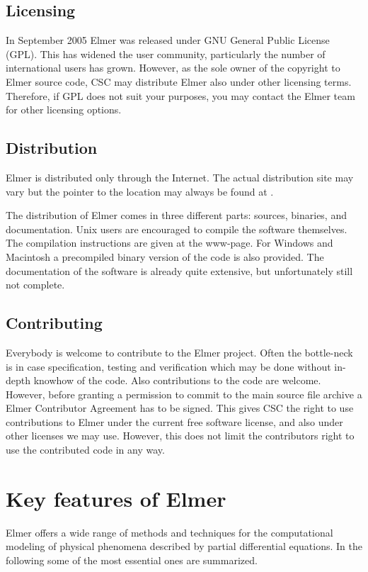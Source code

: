 \subsection*{Licensing}
In September 2005 Elmer was released under GNU General Public License (GPL). This 
has widened the user community, particularly the number of international users has grown.
However, as the sole owner of the copyright to Elmer source code, CSC may distribute 
Elmer also under other licensing terms. Therefore, if GPL does not suit your purposes, 
you may contact the Elmer team for other licensing options. 

\subsection*{Distribution}
Elmer is distributed only through the Internet. The actual distribution site may vary 
but the pointer to the location may always be found at . 

The distribution of Elmer comes in three different parts: sources, binaries, and documentation.
Unix users are encouraged to 
compile the software themselves. The compilation instructions are given at the www-page.
For Windows and Macintosh a precompiled binary version of the code is also provided. 
The documentation of the software is already quite extensive, but unfortunately still not complete.

\subsection*{Contributing}
Everybody is welcome to contribute to the Elmer project. 
Often the bottle-neck is in case specification, testing and verification which may be done 
without in-depth knowhow of the code. Also contributions to the code are welcome. However, before 
granting a permission to commit to the main source file archive a Elmer Contributor Agreement 
has to be signed. This gives CSC the right to use contributions to Elmer under the current free software license, 
and also under other licenses we may use. However, this does not limit the contributors right to use the contributed code
in any way. 


\section{Key features of Elmer}

Elmer offers a wide range of methods and techniques for the computational modeling of
physical phenomena described by partial differential equations.
In the following some of the most essential ones are summarized.

